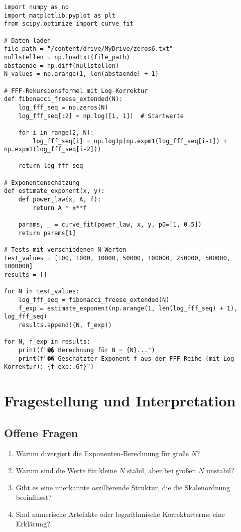 \documentclass[a4paper,12pt]{article}
\begin{document}
\begin{verbatim}
import numpy as np
import matplotlib.pyplot as plt
from scipy.optimize import curve_fit

# Daten laden
file_path = "/content/drive/MyDrive/zeros6.txt"
nullstellen = np.loadtxt(file_path)
abstaende = np.diff(nullstellen)
N_values = np.arange(1, len(abstaende) + 1)

# FFF-Rekursionsformel mit Log-Korrektur
def fibonacci_freese_extended(N):
    log_fff_seq = np.zeros(N)
    log_fff_seq[:2] = np.log([1, 1])  # Startwerte

    for i in range(2, N):
        log_fff_seq[i] = np.log1p(np.expm1(log_fff_seq[i-1]) + np.expm1(log_fff_seq[i-2]))

    return log_fff_seq

# Exponentenschätzung
def estimate_exponent(x, y):
    def power_law(x, A, f):
        return A * x**f

    params, _ = curve_fit(power_law, x, y, p0=[1, 0.5])
    return params[1]

# Tests mit verschiedenen N-Werten
test_values = [100, 1000, 10000, 50000, 100000, 250000, 500000, 1000000]
results = []

for N in test_values:
    log_fff_seq = fibonacci_freese_extended(N)
    f_exp = estimate_exponent(np.arange(1, len(log_fff_seq) + 1), log_fff_seq)
    results.append((N, f_exp))

for N, f_exp in results:
    print(f"�� Berechnung für N = {N}...")
    print(f"�� Geschätzter Exponent f aus der FFF-Reihe (mit Log-Korrektur): {f_exp:.6f}")
\end{verbatim}

\section{Fragestellung und Interpretation}

\subsection{Offene Fragen}
\begin{enumerate}
    \item Warum divergiert die Exponenten-Berechnung für große $N$?
    \item Warum sind die Werte für kleine $N$ stabil, aber bei großen $N$ unstabil?
    \item Gibt es eine unerkannte oszillierende Struktur, die die Skalenordnung beeinflusst?
    \item Sind numerische Artefakte oder logarithmische Korrekturterme eine Erklärung?
\end{enumerate}
\end{document}
